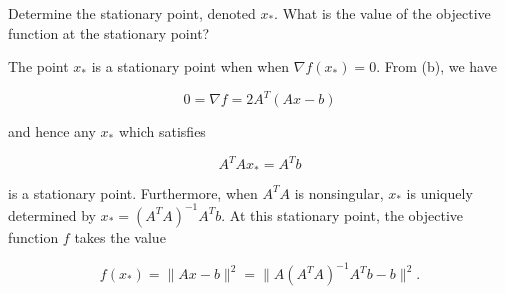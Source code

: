 Determine the stationary point, denoted $x_*$. What is the value of the objective function at the stationary point?

\begin{solution}
  The point $x_*$ is a stationary point when when $\nabla f(x_*) = 0$. From (b), we have

  $$
  0 = \nabla f = 2A^T (Ax - b)
  $$

  and hence any $x_*$ which satisfies

  $$
  A^T A x_* = A^T b
  $$

  is a stationary point. Furthermore, when $A^T A$ is nonsingular, $x_*$ is uniquely determined by 
  $x_* = (A^T A)^{-1} A^T b$. At this stationary point, the objective function $f$ takes the value

  $$
  f(x_*) = \lVert Ax - b \rVert^2 = \lVert A \left( A^T A \right)^{-1} A^T b - b\rVert^2.
  $$
\end{solution}